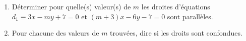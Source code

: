 
\begin{exercice}\label{exosmath-0025}

    \begin{enumerate}
        \item
            Déterminer pour quelle(s) valeur(s) de \( m\) les droites d'équations \( d_1\equiv 3x-my+7=0\) et \( (m+3)x-6y-7=0\) sont parallèles.
        \item
            Pour chacune des valeurs de \( m\) trouvées, dire si les droits sont confondues.
    \end{enumerate}

\end{exercice}
